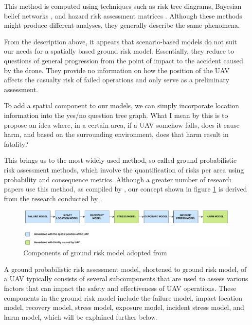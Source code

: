 \documentclass[12pt]{report}
\begin{document}
        This method is computed using techniques such as risk tree diagrams, Bayesian belief networks
        \cite{ancel_real-time_2017}, and hazard risk assessment matrices \cite{barr_preliminary_2017}. Although these
        methods might produce different analyses, they generally describe the same phenomena.
            
        From the description above, it appears that scenario-based models do not suit our needs for a spatially based
        ground risk model. Essentially, they reduce to questions of general progression from the point of impact to the
        accident caused by the drone. They provide no information on how the position of the UAV affects the casualty
        risk of failed operations and only serve as a preliminary assessment.
            
        To add a spatial component to our models, we can simply incorporate location information into the yes/no
        question tree graph. What I mean by this is to propose an idea where, in a certain area, if a UAV somehow falls,
        does it cause harm, and based on the surrounding environment, does that harm result in fatality?
            
        This brings us to the most widely used method, so called ground probabilistic risk assessment methods, which
        involve the quantification of risks per area using probability and consequence metrics. Although a greater
        number of research papers use this method, as compiled by \cite{washington_review_2017}, our concept shown in
        figure \ref{fig:prime_example} is derived from the research conducted by \cite{primatesta_ground_2020}. 

        \begin{figure}[H]
            \centering
            \includegraphics[width=\textwidth]{General Image/OSM Drone-GROUND.pdf}
            \caption{Components of ground risk model adopted from \protect\cite{primatesta_ground_2020}}
            \label{fig:prime_example}
        \end{figure}

        A ground probabilistic risk assessment model, shortened to ground risk model, of a UAV typically consists of
        several subcomponents that are used to assess various factors that can impact the safety and effectiveness of
        UAV operations. These components in the ground risk model include the failure model, impact location model,
        recovery model, stress model, exposure model, incident stress model, and harm model, which will be explained
        further below.
\end{document}
